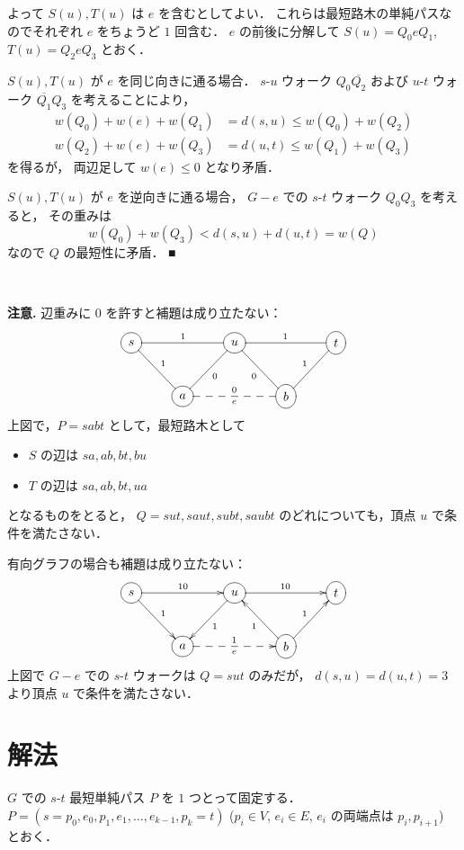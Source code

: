 \documentclass{jsarticle}
\begin{document}
よって $S(u), T(u)$ は $e$ を含むとしてよい．
これらは最短路木の単純パスなのでそれぞれ $e$ をちょうど $1$ 回含む．
$e$ の前後に分解して $S(u) = Q_0 e Q_1$, $T(u) = Q_2 e Q_3$ とおく．

$S(u), T(u)$ が $e$ を同じ向きに通る場合．
$s$-$u$ ウォーク $Q_0 \overline{Q_2}$ および
$u$-$t$ ウォーク $\overline{Q_1} Q_3$ を考えることにより，
\begin{align*}
  w(Q_0) + w(e) + w(Q_1) &= d(s, u) \le w(Q_0) + w(Q_2) \\
  w(Q_2) + w(e) + w(Q_3) &= d(u, t) \le w(Q_1) + w(Q_3)
\end{align*}
を得るが，
両辺足して $w(e) \le 0$ となり矛盾．

$S(u), T(u)$ が $e$ を逆向きに通る場合，
$G-e$ での $s$-$t$ ウォーク $Q_0 Q_3$ を考えると，
その重みは
\[
  w(Q_0) + w(Q_3) < d(s, u) + d(u, t) = w(Q)
\]
なので $Q$ の最短性に矛盾．
\hfill ■

\

\noindent\textbf{注意.}
辺重みに $0$ を許すと補題は成り立たない：
\[
  \xymatrix{
    *++[o][F]{s} \ar@{-}[rd]^1 \ar@{-}[rr]^1 & & *++[o][F]{u} \ar@{-}[ld]^0 \ar@{-}[rr]^1 & & *++[o][F]{t} \\
    & *++[o][F]{a} \ar@{--}[rr]^0_e & & *++[o][F]{b} \ar@{-}[lu]^0 \ar@{-}[ru]^1 &
  }
\]
上図で，$P = sabt$ として，最短路木として
\begin{itemize}
  \item $S$ の辺は $sa, ab, bt, bu$
  \item $T$ の辺は $sa, ab, bt, ua$
\end{itemize}
となるものをとると，
$Q = sut, saut, subt, saubt$ のどれについても，頂点 $u$ で条件を満たさない．

有向グラフの場合も補題は成り立たない：
\[
  \xymatrix{
    *++[o][F]{s} \ar[rd]^1 \ar[rr]^{10} & & *++[o][F]{u} \ar[ld]^1 \ar[rr]^{10} & & *++[o][F]{t} \\
    & *++[o][F]{a} \ar@{-->}[rr]^1_e & & *++[o][F]{b} \ar[lu]^1 \ar[ru]^1 &
  }
\]
上図で $G-e$ での $s$-$t$ ウォークは $Q = sut$ のみだが，
$d(s, u) = d(u, t) = 3$ より頂点 $u$ で条件を満たさない．


\section{解法}
$G$ での $s$-$t$ 最短単純パス $P$ を $1$ つとって固定する．
$P = (s = p_0, e_0, p_1, e_1, \ldots, e_{k-1}, p_k = t)$
($p_i \in V$, $e_i \in E$, $e_i$ の両端点は $p_i, p_{i+1}$)
とおく．
\end{document}

